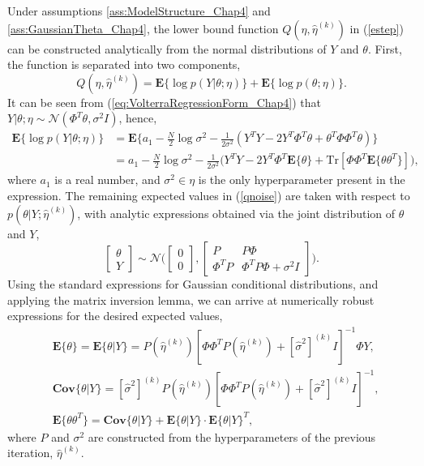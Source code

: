 Under assumptions \ref{ass:ModelStructure_Chap4} and \ref{ass:GaussianTheta_Chap4}, the lower bound function $Q(\eta,\hat{\eta}^{(k)})$ in (\ref{estep}) can be constructed analytically from the normal distributions of $Y$ and $\theta$. First, the function is separated into two components,
\begin{equation}
\label{Qsplit}
Q(\eta,\hat{\eta}^{(k)}) = \textbf{E}\{  \log p(Y|\theta; \eta) \} + \textbf{E}\{ \log p(\theta; \eta) \}.
\end{equation}
It can be seen from (\ref{eq:VolterraRegressionForm_Chap4}) that $Y|\theta;\eta \sim \mathcal{N}(\Phi^T \theta,\sigma^2I)$, hence,
\begin{align}
\textbf{E}\{  \log p(Y|\theta; \eta) \} &= \textbf{E} \{ a_1 - \frac{N}{2} \log \sigma^2 - \frac{1}{2 \sigma^2}(Y^T Y - 2 Y^T \Phi^T \theta + \theta^T \Phi \Phi^T \theta) \} \nonumber \\
&= a_1 - \frac{N}{2} \log \sigma^2 \label{qnoise} - \frac{1}{2 \sigma^2}\big(Y^T Y - 2 Y^T \Phi^T \textbf{E}\{\theta\} + \text{Tr}[\Phi \Phi^T \textbf{E}\{ \theta \theta^T \}]\big),
\end{align}
where $a_1$ is a real number, and $\sigma^2 \in \eta$ is the only hyperparameter present in the expression. The remaining expected values in (\ref{qnoise}) are taken with respect to $p(\theta|Y; \hat{\eta}^{(k)})$, with analytic expressions obtained via the joint distribution of $\theta$ and $Y$,
\begin{equation}
\begin{bmatrix}
\theta \\ 
Y
\end{bmatrix} \sim \mathcal{N} \Bigg(
\begin{bmatrix}
0\\ 
0
\end{bmatrix},
\begin{bmatrix}
P & P \Phi\\ 
\Phi^T P & \Phi^T P \Phi + \sigma^2 I 
\end{bmatrix} \Bigg).
\end{equation}
Using the standard expressions for Gaussian conditional distributions, and applying the matrix inversion lemma, we can arrive at numerically robust expressions for the desired expected values, 
\begin{align}
&\textbf{E} \{ \theta \} = \textbf{E} \{ \theta | Y \} = P(\hat{\eta}^{(k)}) [\Phi \Phi^T P(\hat{\eta}^{(k)}) + [\hat{\sigma}^2]^{(k)} I]^{-1} \Phi Y, \\
&\textbf{Cov} \{ \theta| Y \} = [\hat{\sigma}^2]^{(k)} P(\hat{\eta}^{(k)}) [\Phi \Phi^T P(\hat{\eta}^{(k)}) + [\hat{\sigma}^2]^{(k)} I]^{-1}, \\
&\textbf{E} \{ \theta \theta^T\} = \textbf{Cov} \{ \theta| Y \} + \textbf{E} \{ \theta | Y \} \cdot \textbf{E} \{ \theta | Y \}^T,
\label{expect3}
\end{align}
where $P$ and $\sigma^2$ are constructed from the hyperparameters of the previous iteration, $\hat{\eta}^{(k)}$.

